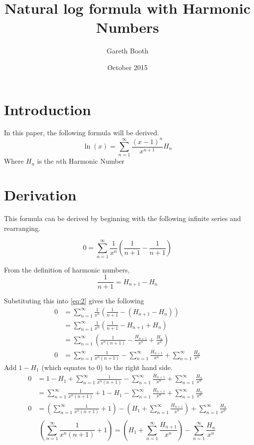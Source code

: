 \documentclass[11pt]{article}
\title{Natural log formula with Harmonic Numbers}
\author{Gareth Booth}
\date{October 2015}
\begin{document}
\maketitle

\section{Introduction}

In this paper, the following formula will be derived.
\begin{equation} \label{eq:derived}
    \ln(x)=\sum_{n=1}^{\infty}{\frac{{\left(x-1\right)}^{n}}{x^{n+1}}}H_n
\end{equation}
Where $H_{n}$ is the $n$th Harmonic Number

\section{Derivation}
This formula can be derived by beginning with the following infinite series and rearranging.

\begin{equation} \label{eq:2}
0=\sum_{n=1}^{\infty}{\frac{1}{x^n}\left(\frac{1}{n+1}-\frac{1}{n+1} \right)}
\end{equation}

From the definition of harmonic numbers,
$$\frac{1}{n+1}=H_{n+1}-H_{n}$$

Substituting this into \eqref{eq:2} gives the following
  \begin{align*}
0&=\sum_{n=1}^{\infty}{\frac{1}{x^n}\left(\frac{1}{n+1}-\left(H_{n+1}-H_{n}\right)\right)}\\
&=\sum_{n=1}^{\infty}{\frac{1}{x^n}\left(\frac{1}{n+1}-H_{n+1}+H_{n}\right)}\\
&=\sum_{n=1}^{\infty}{\left(\frac{1}{x^n\left(n+1\right)}-\frac{H_{n+1}}{x^n}+\frac{H_{n}}{x^n}\right)}\\
0&=\sum_{n=1}^{\infty}{\frac{1}{x^n\left(n+1\right)}}-\sum_{n=1}^{\infty}{\frac{H_{n+1}}{x^n}}+\sum_{n=1}^{\infty}{\frac{H_{n}}{x^n}}
  \end{align*}
Add $1-H_1$ (which equates to $0$) to the right hand side.
  \begin{align*}
0&=1-H_1+\sum_{n=1}^{\infty}{\frac{1}{x^n\left(n+1\right)}}-\sum_{n=1}^{\infty}{\frac{H_{n+1}}{x^n}}+\sum_{n=1}^{\infty}{\frac{H_{n}}{x^n}}\\
&=\sum_{n=1}^{\infty}{\frac{1}{x^n\left(n+1\right)}}+1-H_1-\sum_{n=1}^{\infty}{\frac{H_{n+1}}{x^n}}+\sum_{n=1}^{\infty}{\frac{H_{n}}{x^n}}\\
0&=\left(\sum_{n=1}^{\infty}{\frac{1}{x^n\left(n+1\right)}}+1\right)-\left(H_1+ \sum_{n=1}^{\infty}{\frac{H_{n+1}}{x^n}}\right )+\sum_{n=1}^{\infty}{\frac{H_{n}}{x^n}}\\
  \end{align*}
\begin{equation} \label{eq:3}
\left(\sum_{n=1}^{\infty}{\frac{1}{x^n\left(n+1\right)}}+1\right)=\left(H_1+ \sum_{n=1}^{\infty}{\frac{H_{n+1}}{x^n}}\right )-\sum_{n=1}^{\infty}{\frac{H_{n}}{x^n}}
\end{equation}
\end{document}
